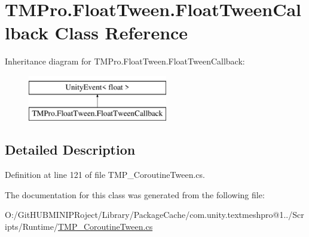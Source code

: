 \hypertarget{class_t_m_pro_1_1_float_tween_1_1_float_tween_callback}{}\section{T\+M\+Pro.\+Float\+Tween.\+Float\+Tween\+Callback Class Reference}
\label{class_t_m_pro_1_1_float_tween_1_1_float_tween_callback}
Inheritance diagram for T\+M\+Pro.\+Float\+Tween.\+Float\+Tween\+Callback\+:\begin{figure}[H]
\begin{center}
\leavevmode
\includegraphics[height=2.000000cm]{class_t_m_pro_1_1_float_tween_1_1_float_tween_callback}
\end{center}
\end{figure}


\subsection{Detailed Description}


Definition at line 121 of file T\+M\+P\+\_\+\+Coroutine\+Tween.\+cs.



The documentation for this class was generated from the following file\+:\begin{DoxyCompactItemize}
\item 
O\+:/\+Git\+H\+U\+B\+M\+I\+N\+I\+P\+Roject/\+Library/\+Package\+Cache/com.\+unity.\+textmeshpro@1../\+Scripts/\+Runtime/\mbox{\hyperlink{_t_m_p___coroutine_tween_8cs}{T\+M\+P\+\_\+\+Coroutine\+Tween.\+cs}}\end{DoxyCompactItemize}
